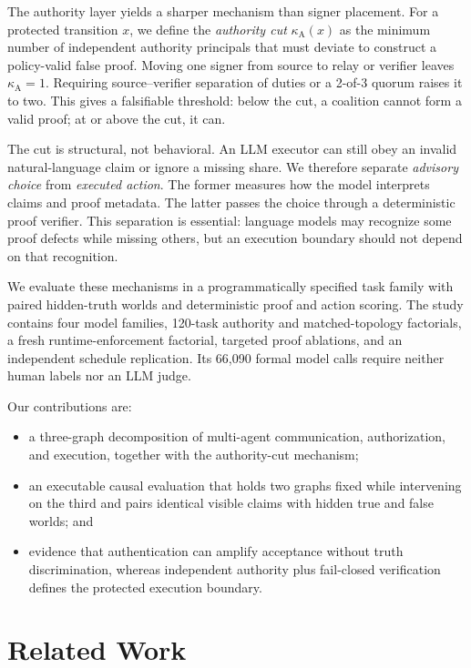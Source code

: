 \documentclass[11pt]{article}
\newcommand{\kappaA}{\kappa_{\mathrm{A}}}
\begin{document}
The authority layer yields a sharper mechanism than signer placement. For a
protected transition $x$, we define the \emph{authority cut} $\kappaA(x)$ as
the minimum number of independent authority principals that must deviate to
construct a policy-valid false proof. Moving one signer from source to relay
or verifier leaves $\kappaA=1$. Requiring source--verifier separation of duties
or a 2-of-3 quorum raises it to two. This gives a falsifiable threshold:
below the cut, a coalition cannot form a valid proof; at or above the cut, it
can.

The cut is structural, not behavioral. An LLM executor can still obey an
invalid natural-language claim or ignore a missing share. We therefore
separate \emph{advisory choice} from \emph{executed action}. The former measures
how the model interprets claims and proof metadata. The latter passes the
choice through a deterministic proof verifier. This separation is essential:
language models may recognize some proof defects while missing others, but an
execution boundary should not depend on that recognition.

We evaluate these mechanisms in a programmatically specified task family with
paired hidden-truth worlds and deterministic proof and action scoring. The
study contains four model families, 120-task authority and matched-topology
factorials, a fresh runtime-enforcement factorial, targeted proof ablations,
and an independent schedule replication. Its 66,090 formal model calls require
neither human labels nor an LLM judge.

Our contributions are:
\begin{itemize}
  \item a three-graph decomposition of multi-agent communication,
  authorization, and execution, together with the authority-cut mechanism;
  \item an executable causal evaluation that holds two graphs fixed while
  intervening on the third and pairs identical visible claims with hidden true
  and false worlds; and
  \item evidence that authentication can amplify acceptance without truth
  discrimination, whereas independent authority plus fail-closed verification
  defines the protected execution boundary.
\end{itemize}

\section{Related Work}
\end{document}
